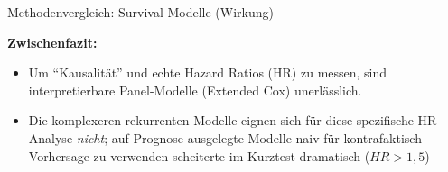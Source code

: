 \documentclass[12pt]{beamer}
\begin{document}
\begin{frame}{Methodenvergleich: Survival-Modelle (Wirkung)}
    \vspace{0.2cm}
    \begin{table}[]
        \centering
    \end{table}
    
\textbf{Zwischenfazit:}
    \begin{itemize}
        \item Um \enquote{Kausalität} und echte Hazard Ratios (HR) zu messen, sind interpretierbare Panel-Modelle (Extended Cox) unerlässlich. 
	\item Die komplexeren rekurrenten Modelle eignen sich für diese spezifische HR-Analyse \textit{nicht}; auf Prognose ausgelegte Modelle naiv für kontrafaktisch Vorhersage zu verwenden scheiterte im Kurztest dramatisch ($HR > 1,5$)
    \end{itemize}
\end{frame}
\end{document}
